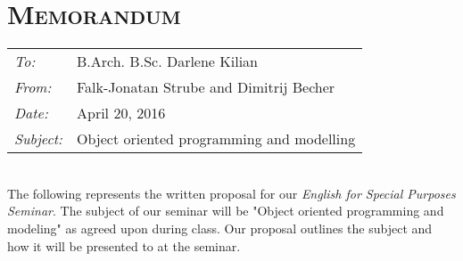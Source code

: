 
\renewcommand{\workingdir}{../../}



\DNotiz{}
\renewcommand{\Dokumentensignatur}{}




\chapter*{\textsc{Memorandum}}
\begin{tabular}{l l}
\emph{To:} & B.Arch. B.Sc. Darlene Kilian\\
\emph{From:} & Falk-Jonatan Strube and Dimitrij Becher\\
\emph{Date:} & April 20, 2016\\
\emph{Subject:} & Object oriented programming and modelling\\
\end{tabular}\medskip\\
The following represents the written proposal for our \emph{English for Special Purposes Seminar}. The subject of our seminar will be "Object oriented programming and modeling" as agreed upon during class. Our proposal outlines the subject and how it will be presented to at the seminar. 

